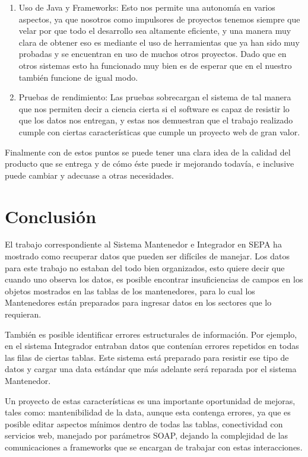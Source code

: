 \documentclass[a4paper,12pt,openany,oneside]{book}
\begin{document}
\begin{enumerate}
        \item Uso de Java y Frameworks: Esto nos permite una autonomía en varios aspectos, ya que nosotros como impulsores de proyectos tenemos siempre que velar por que todo el desarrollo sea altamente eficiente, y una manera muy clara de obtener eso es mediante el uso de herramientas que ya han sido muy probadas y se encuentran en uso de muchos otros proyectos. Dado que en otros sistemas esto ha funcionado muy bien es de esperar que en el nuestro también funcione de igual modo.
        \item Pruebas de rendimiento: Las pruebas sobrecargan el sistema de tal manera que nos permiten decir a ciencia cierta si el software es capaz de resistir lo que los datos nos entregan, y estas nos demuestran que el trabajo realizado cumple con ciertas características que cumple un proyecto web de gran valor.
\end{enumerate}

Finalmente con de estos puntos se puede tener una clara idea de la calidad del producto que se entrega y de cómo éste puede ir mejorando todavía, e inclusive puede cambiar y adecuase a otras necesidades.

\section{Conclusión}
El trabajo correspondiente al Sistema Mantenedor e Integrador en SEPA ha mostrado como recuperar datos que pueden ser difíciles de manejar. Los datos para este trabajo no estaban del todo bien organizados, esto quiere decir que cuando uno observa los datos, es posible encontrar insuficiencias de campos en los objetos mostrados en las tablas de los mantenedores, para lo cual los Mantenedores están preparados para ingresar datos en los sectores que lo requieran.

También es posible identificar errores estructurales de información. Por ejemplo, en el sistema Integrador entraban datos que contenían errores repetidos en todas las filas de ciertas tablas. Este sistema está preparado para resistir ese tipo de datos y cargar una data estándar que más adelante será reparada por el sistema Mantenedor.

Un proyecto de estas características es una importante oportunidad de mejoras, tales como: mantenibilidad de la data, aunque esta contenga errores, ya que es posible editar aspectos mínimos dentro de todas las tablas, conectividad con servicios web, manejado por parámetros SOAP, dejando la complejidad de las comunicaciones a frameworks que se encargan de trabajar con estas interacciones.
\end{document}
